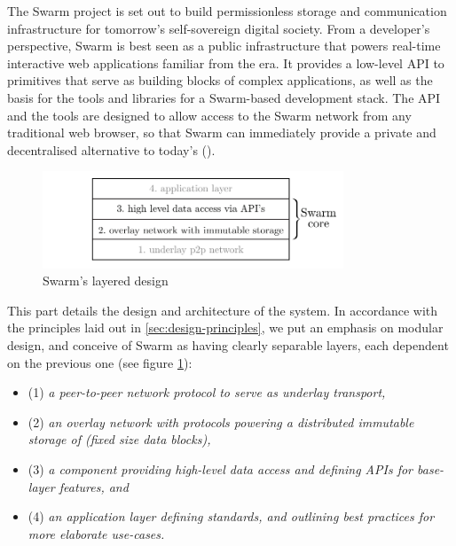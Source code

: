 
\green{}

The Swarm project is set out to build permissionless storage and communication infrastructure for tomorrow's self-sovereign digital society. From a developer's perspective, Swarm is best seen as a public infrastructure that powers real-time interactive web applications familiar from the  era. It provides a low-level API to primitives that serve as building blocks of complex applications, as well as the basis for the tools and libraries for a Swarm-based  development stack. The API and the tools are designed to allow access to the Swarm network from any traditional web browser, so that Swarm can immediately provide a private and decentralised alternative to today's  ().

\begin{figure}[htbp]
  \centering
    \includegraphics[width=0.8\textwidth]{fig/swarm-layered-design.pdf}
  \caption[Swarm's layered design \statusgreen]{Swarm's layered design}
\label{fig:Swarm-layered-design}
\end{figure}

This part details the design and architecture of the system. In accordance with the principles laid out in \ref{sec:design-principles}, we put an emphasis on modular design, and conceive of Swarm as having clearly separable layers, each dependent on the previous one (see figure \ref{fig:Swarm-layered-design}):

\begin{itemize}
\item (1) \emph{a peer-to-peer network protocol to serve as underlay transport,}
\item (2) \emph{an overlay network with protocols powering a distributed immutable storage of  (fixed size data blocks),}
\item (3) \emph{a component providing high-level data access and defining APIs for base-layer features, and}
\item (4) \emph{an application layer defining standards, and outlining best practices for more elaborate use-cases.}
\end{itemize}

